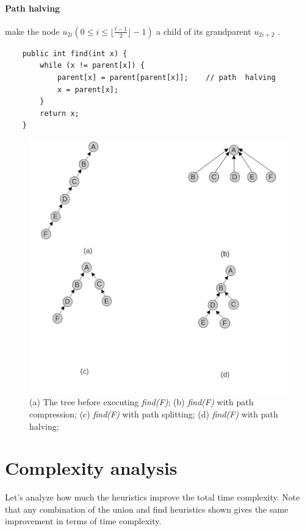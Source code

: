 \documentclass{article}
\begin{document}
\paragraph{Path halving}  make the node $u_{2i} ( 0 \leq i \leq \lfloor \frac{l-1}{2}\rfloor - 1)$ a child 
of its grandparent $u_{2i+2}$\cite{van1977alternative} \cite{van1980datastructures}.
\begin{lstlisting}
    public int find(int x) {
        while (x != parent[x]) {
            parent[x] = parent[parent[x]];    // path  halving
            x = parent[x];
        }
        return x;
    }
\end{lstlisting}
\begin{figure}[h!]
    \includegraphics[width = \linewidth]{img/pc.jpg}
    \caption{(a) The tree before executing \emph{find(F)};
    (b) \emph{find(F)} with path compression;
    (c) \emph{find(F)} with path splitting;
    (d) \emph{find(F)} with path halving;
    }
    \label{fig:pc}   
\end{figure}
\newpage
\section{Complexity analysis}\label{complex}
Let's analyze how much the heuristics improve the total time complexity. Note that any combination of 
the union and find heuristics  shown gives the same improvement in terms of time complexity. 
\end{document}
